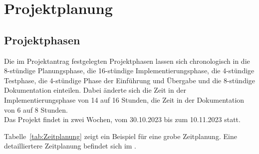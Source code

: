 \section{Projektplanung} 
\label{sec:Projektplanung}

\subsection{Projektphasen}
\label{sec:Projektphasen}
Die im Projektantrag festgelegten Projektphasen lassen sich chronologisch in die 8-stündige Planungsphase, 
die 16-stündige Implementierungsphase, die 4-stündige Testphase, die 4-stündige Phase der Einführung und Übergabe 
und die 8-stündige Dokumentation einteilen.
Dabei änderte sich die Zeit in der Implementierungsphase von 14 auf 16 Stunden, die Zeit in der 
Dokumentation von 6 auf 8 Stunden.
\\Das Projekt findet in zwei Wochen, vom 30.10.2023 bis zum 10.11.2023 statt.

Tabelle~\ref{tab:Zeitplanung}  zeigt ein Beispiel für eine grobe Zeitplanung. 
Eine detailliertere Zeitplanung befindet sich im  .


